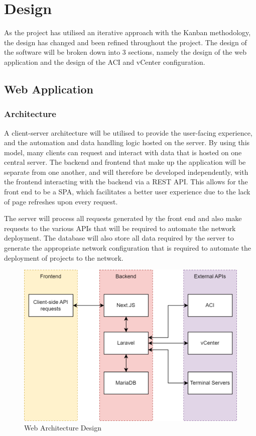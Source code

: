 \chapter{Design}
\label{chap:design}
As the project has utilised an iterative approach with the Kanban methodology, the design has changed and been refined throughout the project. The design of the software will be broken down into 3 sections, namely the design of the web application and the design of the ACI and vCenter configuration.

\section{Web Application}
\label{design:web-application}
\subsection{Architecture}
\label{design:web-application:architecture}

A client-server architecture will be utilised to provide the user-facing experience, and the automation and data handling logic hosted on the server. By using this model, many clients can request and interact with data that is hosted on one central server. The backend and frontend that make up the application will be separate from one another, and will therefore be developed independently, with the frontend interacting with the backend via a REST API. This allows for the front end to be a SPA, which facilitates a better user experience due to the lack of page refreshes upon every request.

The server will process all requests generated by the front end and also make requests to the various APIs that will be required to automate the network deployment. The database will also store all data required by the server to generate the appropriate network configuration that is required to automate the deployment of projects to the network.

\begin{figure}[H]
    \centering
    \includegraphics[scale=0.3]{images/web-architecture.png}
    \caption{Web Architecture Design}
    \label{fig:web-architecture}
\end{figure}

